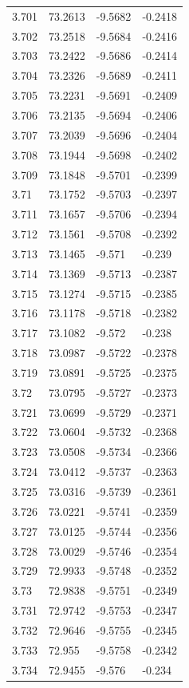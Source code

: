 \begin{tabular}{llll}
3.701 & 73.2613 & -9.5682 & -0.2418 \\
3.702 & 73.2518 & -9.5684 & -0.2416 \\
3.703 & 73.2422 & -9.5686 & -0.2414 \\
3.704 & 73.2326 & -9.5689 & -0.2411 \\
3.705 & 73.2231 & -9.5691 & -0.2409 \\
3.706 & 73.2135 & -9.5694 & -0.2406 \\
3.707 & 73.2039 & -9.5696 & -0.2404 \\
3.708 & 73.1944 & -9.5698 & -0.2402 \\
3.709 & 73.1848 & -9.5701 & -0.2399 \\
3.71 & 73.1752 & -9.5703 & -0.2397 \\
3.711 & 73.1657 & -9.5706 & -0.2394 \\
3.712 & 73.1561 & -9.5708 & -0.2392 \\
3.713 & 73.1465 & -9.571 & -0.239 \\
3.714 & 73.1369 & -9.5713 & -0.2387 \\
3.715 & 73.1274 & -9.5715 & -0.2385 \\
3.716 & 73.1178 & -9.5718 & -0.2382 \\
3.717 & 73.1082 & -9.572 & -0.238 \\
3.718 & 73.0987 & -9.5722 & -0.2378 \\
3.719 & 73.0891 & -9.5725 & -0.2375 \\
3.72 & 73.0795 & -9.5727 & -0.2373 \\
3.721 & 73.0699 & -9.5729 & -0.2371 \\
3.722 & 73.0604 & -9.5732 & -0.2368 \\
3.723 & 73.0508 & -9.5734 & -0.2366 \\
3.724 & 73.0412 & -9.5737 & -0.2363 \\
3.725 & 73.0316 & -9.5739 & -0.2361 \\
3.726 & 73.0221 & -9.5741 & -0.2359 \\
3.727 & 73.0125 & -9.5744 & -0.2356 \\
3.728 & 73.0029 & -9.5746 & -0.2354 \\
3.729 & 72.9933 & -9.5748 & -0.2352 \\
3.73 & 72.9838 & -9.5751 & -0.2349 \\
3.731 & 72.9742 & -9.5753 & -0.2347 \\
3.732 & 72.9646 & -9.5755 & -0.2345 \\
3.733 & 72.955 & -9.5758 & -0.2342 \\
3.734 & 72.9455 & -9.576 & -0.234 \\

\end{tabular}
